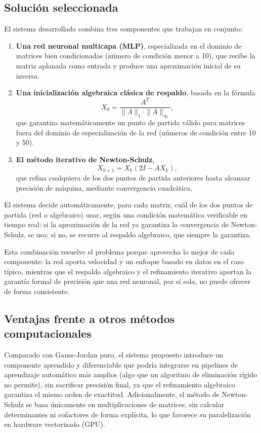 \documentclass[12pt,a4paper]{article}
\begin{document}
\subsection{Solución seleccionada}

El sistema desarrollado combina tres componentes que trabajan en conjunto:

\begin{enumerate}
    \item \textbf{Una red neuronal multicapa (MLP)}, especializada en el dominio de matrices bien condicionadas (número de condición menor a 10), que recibe la matriz aplanada como entrada y produce una aproximación inicial de su inversa.

    \item \textbf{Una inicialización algebraica clásica de respaldo}, basada en la fórmula
    \[
        X_0 = \frac{A^T}{\|A\|_1 \cdot \|A\|_\infty},
    \]
    que garantiza matemáticamente un punto de partida válido para matrices fuera del dominio de especialización de la red (números de condición entre 10 y 50).

    \item \textbf{El método iterativo de Newton-Schulz},
    \[
        X_{k+1} = X_k(2I - AX_k),
    \]
    que refina cualquiera de los dos puntos de partida anteriores hasta alcanzar precisión de máquina, mediante convergencia cuadrática.
\end{enumerate}

El sistema decide automáticamente, para cada matriz, cuál de los dos puntos de partida (red o algebraico) usar, según una condición matemática verificable en tiempo real: si la aproximación de la red ya garantiza la convergencia de Newton-Schulz, se usa; si no, se recurre al respaldo algebraico, que siempre la garantiza.

Esta combinación resuelve el problema porque aprovecha lo mejor de cada componente: la red aporta velocidad y un enfoque basado en datos en el caso típico, mientras que el respaldo algebraico y el refinamiento iterativo aportan la garantía formal de precisión que una red neuronal, por sí sola, no puede ofrecer de forma consistente.

\subsection{Ventajas frente a otros métodos computacionales}

Comparado con Gauss-Jordan puro, el sistema propuesto introduce un componente aprendido y diferenciable que podría integrarse en pipelines de aprendizaje automático más amplios (algo que un algoritmo de eliminación rígido no permite), sin sacrificar precisión final, ya que el refinamiento algebraico garantiza el mismo orden de exactitud. Adicionalmente, el método de Newton-Schulz se basa únicamente en multiplicaciones de matrices, sin calcular determinantes ni cofactores de forma explícita, lo que favorece su paralelización en hardware vectorizado (GPU).
\end{document}
